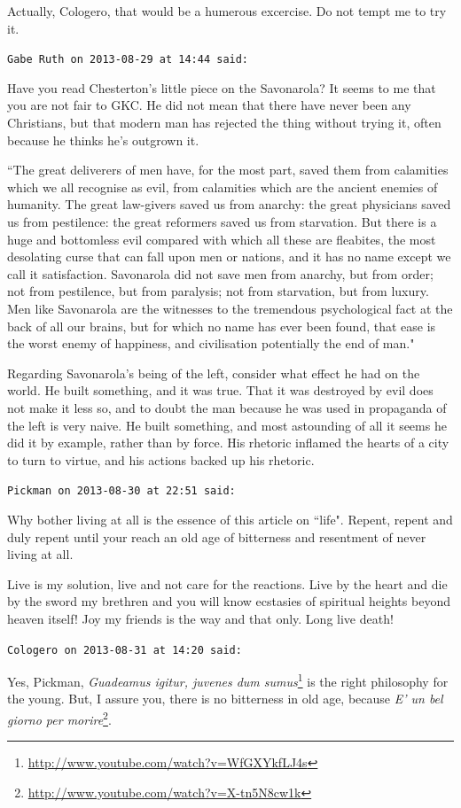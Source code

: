 \begin{footnotesize}
\begin{sffamily}
Actually, Cologero, that would be a humerous excercise. Do not tempt me to try it.


\hfill

\texttt{Gabe Ruth on 2013-08-29 at 14:44 said: }

Have you read Chesterton's little piece on the Savonarola? It seems to me that you are not fair to GKC. He did not mean that there have never been any Christians, but that modern man has rejected the thing without trying it, often because he thinks he's outgrown it. 

``The great deliverers of men have, for the most part, saved them from calamities which we all recognise as evil, from calamities which are the ancient enemies of humanity. The great law-givers saved us from anarchy: the great physicians saved us from pestilence: the great reformers saved us from starvation. But there is a huge and bottomless evil compared with which all these are fleabites, the most desolating curse that can fall upon men or nations, and it has no name except we call it satisfaction. Savonarola did not save men from anarchy, but from order; not from pestilence, but from paralysis; not from starvation, but from luxury. Men like Savonarola are the witnesses to the tremendous psychological fact at the back of all our brains, but for which no name has ever been found, that ease is the worst enemy of happiness, and civilisation potentially the end of man." 

Regarding Savonarola's being of the left, consider what effect he had on the world. He built something, and it was true. That it was destroyed by evil does not make it less so, and to doubt the man because he was used in propaganda of the left is very naive. He built something, and most astounding of all it seems he did it by example, rather than by force. His rhetoric inflamed the hearts of a city to turn to virtue, and his actions backed up his rhetoric.


\hfill

\texttt{Pickman on 2013-08-30 at 22:51 said: }

Why bother living at all is the essence of this article on ``life". Repent, repent and duly repent until your reach an old age of bitterness and resentment of never living at all. 

Live is my solution, live and not care for the reactions. Live by the heart and die by the sword my brethren and you will know ecstasies of spiritual heights beyond heaven itself! Joy my friends is the way and that only. Long live death!


\hfill

\texttt{Cologero on 2013-08-31 at 14:20 said: }

Yes, Pickman, \textit{Guadeamus igitur, juvenes dum sumus}\footnote{\url{http://www.youtube.com/watch?v=WfGXYkfLJ4s}} is the right philosophy for the young. But, I assure you, there is no bitterness in old age, because \textit{E' un bel giorno per morire}\footnote{\url{http://www.youtube.com/watch?v=X-tn5N8cw1k}}.


\end{sffamily}\end{footnotesize}
